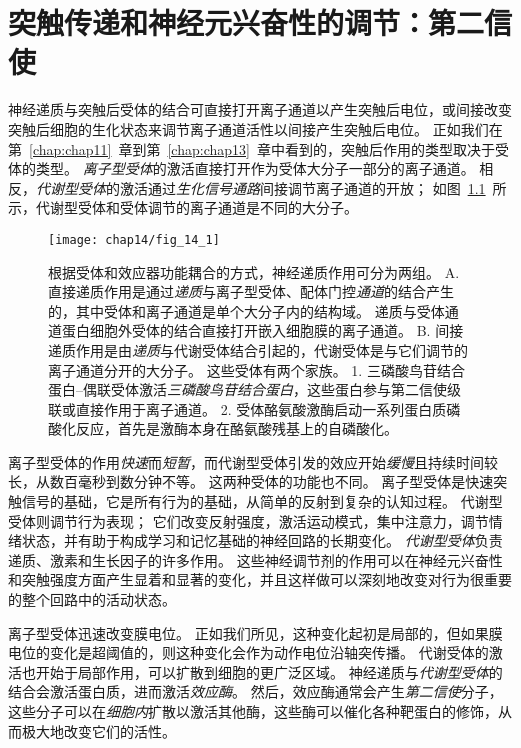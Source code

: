 \chapter{突触传递和神经元兴奋性的调节：第二信使} \label{chap:chap14}

神经递质与突触后受体的结合可直接打开离子通道以产生突触后电位，或间接改变突触后细胞的生化状态来调节离子通道活性以间接产生突触后电位。
正如我们在第~\ref{chap:chap11}~章到第~\ref{chap:chap13}~章中看到的，突触后作用的类型取决于受体的类型。
\textit{离子型受体}的激活直接打开作为受体大分子一部分的离子通道。
相反，\textit{代谢型受体}的激活通过\textit{生化信号通路}间接调节离子通道的开放；
如图~\ref{fig:14_1}~所示，代谢型受体和受体调节的离子通道是不同的大分子。


\begin{figure}[htbp]
	\centering
	\texttt{[image: chap14/fig\_14\_1]}
	\caption{根据受体和效应器功能耦合的方式，神经递质作用可分为两组。
		A. 直接递质作用是通过\textit{递质}与离子型受体、配体门控\textit{通道}的结合产生的，其中受体和离子通道是单个大分子内的结构域。
		递质与受体通道蛋白细胞外受体的结合直接打开嵌入细胞膜的离子通道。
		B. 间接递质作用是由\textit{递质}与代谢受体结合引起的，代谢受体是与它们调节的离子通道分开的大分子。
		这些受体有两个家族。
		1. 三磷酸鸟苷结合蛋白–偶联受体激活\textit{三磷酸鸟苷结合蛋白}，这些蛋白参与第二信使级联或直接作用于离子通道。
		2. 受体酪氨酸激酶启动一系列蛋白质磷酸化反应，首先是激酶本身在酪氨酸残基上的自磷酸化。}
	\label{fig:14_1}
\end{figure}


离子型受体的作用\textit{快速}而\textit{短暂}，而代谢型受体引发的效应开始\textit{缓慢}且持续时间较长，从数百毫秒到数分钟不等。
这两种受体的功能也不同。
离子型受体是快速突触信号的基础，它是所有行为的基础，从简单的反射到复杂的认知过程。
代谢型受体则调节行为表现；
它们改变反射强度，激活运动模式，集中注意力，调节情绪状态，并有助于构成学习和记忆基础的神经回路的长期变化。
\textit{代谢型受体}负责递质、激素和生长因子的许多作用。
这些神经调节剂的作用可以在神经元兴奋性和突触强度方面产生显着和显著的变化，并且这样做可以深刻地改变对行为很重要的整个回路中的活动状态。


离子型受体迅速改变膜电位。
正如我们所见，这种变化起初是局部的，但如果膜电位的变化是超阈值的，则这种变化会作为动作电位沿轴突传播。
代谢受体的激活也开始于局部作用，可以扩散到细胞的更广泛区域。
神经递质与\textit{代谢型受体}的结合会激活蛋白质，进而激活\textit{效应酶}。
然后，效应酶通常会产生\textit{第二信使}分子，这些分子可以在\textit{细胞内}扩散以激活其他酶，这些酶可以催化各种靶蛋白的修饰，从而极大地改变它们的活性。


